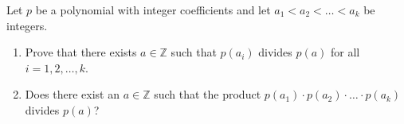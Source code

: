 \documentclass{article}
\begin{document}
\setlength{\parindent}{0pt}
Let $p$ be a polynomial with integer coefficients and let $a_{1}<a_{2}<\dots<a_{k}$ be integers.
\begin{enumerate}[label=\alph*)]
\item Prove that there exists $a\in\mathbb{Z}$ such that $p(a_{i})$ divides $p(a)$ for all $i=1,2,\dots,k$.
\item Does there exist an $a\in\mathbb{Z}$ such that the product $p(a_{1})\cdot p(a_{2})\cdot{\dots}\cdot p(a_{k})$ divides $p(a)$?
\end{enumerate}
\end{document}
